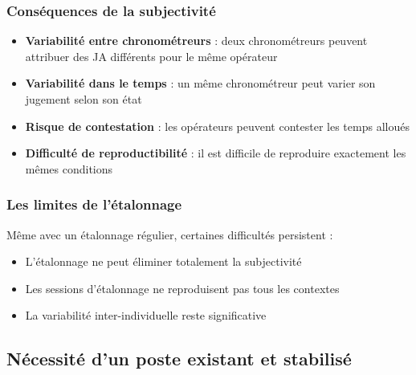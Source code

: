 \documentclass[a4paper,12pt]{article}
\begin{document}
\subsubsection{Conséquences de la subjectivité}

\begin{itemize}
    \item \textbf{Variabilité entre chronométreurs} : deux chronométreurs peuvent attribuer des JA différents pour le même opérateur
    \item \textbf{Variabilité dans le temps} : un même chronométreur peut varier son jugement selon son état
    \item \textbf{Risque de contestation} : les opérateurs peuvent contester les temps alloués
    \item \textbf{Difficulté de reproductibilité} : il est difficile de reproduire exactement les mêmes conditions
\end{itemize}

\begin{center}
\end{center}

\subsubsection{Les limites de l'étalonnage}

Même avec un étalonnage régulier, certaines difficultés persistent :

\begin{itemize}
    \item L'étalonnage ne peut éliminer totalement la subjectivité
    \item Les sessions d'étalonnage ne reproduisent pas tous les contextes
    \item La variabilité inter-individuelle reste significative
\end{itemize}

\subsection{Nécessité d'un poste existant et stabilisé}
\end{document}
